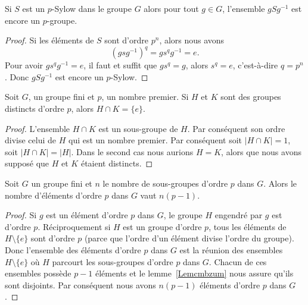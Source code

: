\begin{proposition}
    Si \( S\) est un \( p\)-Sylow dans le groupe \( G\) alors pour tout \( g\in G\), l'ensemble \( gSg^{-1}\) est encore un \( p\)-groupe.
\end{proposition}

\begin{proof}
    Si les éléments de \( S\) sont d'ordre \( p^n\), alors nous avons
    \begin{equation}
        (gsg^{-1})^q=gs^qg^{-1}=e.
    \end{equation}
    Pour avoir \( gs^qg^{-1}=e\), il faut et suffit que \( gs^q=g\), alors \( s^q=e\), c'est-à-dire \( q=p^n\). Donc \( gSg^{-1}\) est encore un \( p\)-Sylow.
\end{proof}

\begin{lemma}\label{Lemcmbzum}
    Soit \( G\), un groupe fini et \( p\), un nombre premier. Si \( H\) et \( K\) sont des groupes distincts d'ordre \( p\), alors \( H\cap K=\{ e \}\).
\end{lemma}

\begin{proof}
    L'ensemble \( H\cap K\) est un sous-groupe de \( H\). Par conséquent son ordre divise celui de \( H\) qui est un nombre premier. Par conséquent soit \( | H\cap K |=1\), soit \( | H\cap K |=| H |\). Dans le second cas nous aurions \( H=K\), alors que nous avons supposé que \( H\) et \( K\) étaient distincts.
\end{proof}

\begin{proposition} \label{PropyfhTmf}
    Soit \( G\) un groupe fini et \( n\) le nombre de sous-groupes d'ordre \( p\) dans \( G\). Alors le nombre d'éléments d'ordre \( p\) dans \( G\) vaut \( n(p-1)\).
\end{proposition}

\begin{proof}
    Si \( g\) est un élément d'ordre \( p\) dans \( G\), le groupe \( H\) engendré par \( g\) est d'ordre \( p\). Réciproquement si \( H\) est un groupe d'ordre \( p\), tous les éléments de \( H\setminus\{ e \}\) sont d'ordre \( p\) (parce que l'ordre d'un élément divise l'ordre du groupe). Donc l'ensemble des éléments d'ordre \( p\) dans \( G\) est la réunion des ensembles \( H\setminus\{ e \}\) où \( H\) parcourt les sous-groupes d'ordre \( p\) dans \( G\). Chacun de ces ensembles possède \( p-1\) éléments et le lemme~\ref{Lemcmbzum} nous assure qu'ils sont disjoints. Par conséquent nous avons \( n(p-1)\) éléments d'ordre \( p\) dans \( G\).
\end{proof}

